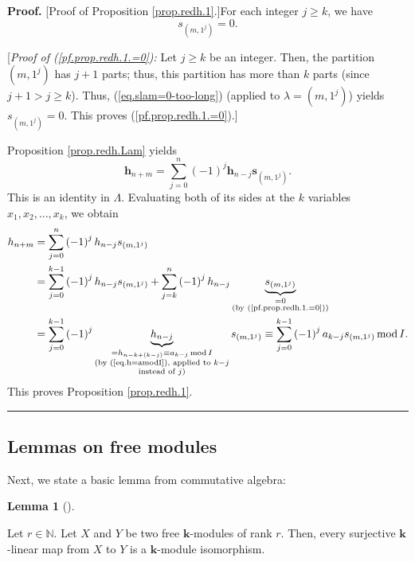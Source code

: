 \documentclass[numbers=enddot,12pt,final,onecolumn,notitlepage]{scrartcl}%
\theoremstyle{definition}
\newtheorem{lem}[theo]{Lemma}
\newenvironment{lemma}[1][]
{\begin{lem}[#1]\begin{leftbar}}
{\end{leftbar}\end{lem}}
\newenvironment{proof}[1][Proof]{\noindent\textbf{#1.} }{\ \rule{0.5em}{0.5em}}
\let\sumnonlimits\sum
\renewcommand{\sum}{\sumnonlimits\limits}
\begin{document}
\begin{proof}
[Proof of Proposition \ref{prop.redh.1}.]For each integer $j\geq k$, we have%
\begin{equation}
s_{\left(  m,1^{j}\right)  }=0. \label{pf.prop.redh.1.=0}%
\end{equation}


[\textit{Proof of (\ref{pf.prop.redh.1.=0}):} Let $j\geq k$ be an integer.
Then, the partition $\left(  m,1^{j}\right)  $ has $j+1$ parts; thus, this
partition has more than $k$ parts (since $j+1>j\geq k$). Thus,
(\ref{eq.slam=0-too-long}) (applied to $\lambda=\left(  m,1^{j}\right)  $)
yields $s_{\left(  m,1^{j}\right)  }=0$. This proves (\ref{pf.prop.redh.1.=0}).]

Proposition \ref{prop.redh.Lam} yields%
\[
\mathbf{h}_{n+m}=\sum_{j=0}^{n}\left(  -1\right)  ^{j}\mathbf{h}%
_{n-j}\mathbf{s}_{\left(  m,1^{j}\right)  }.
\]
This is an identity in $\Lambda$. Evaluating both of its sides at the $k$
variables $x_{1},x_{2},\ldots,x_{k}$, we obtain%
\begin{align*}
h_{n+m}  &  =\sum_{j=0}^{n}\left(  -1\right)  ^{j}h_{n-j}s_{\left(
m,1^{j}\right)  }\\
&  =\sum_{j=0}^{k-1}\left(  -1\right)  ^{j}h_{n-j}s_{\left(  m,1^{j}\right)
}+\sum_{j=k}^{n}\left(  -1\right)  ^{j}h_{n-j}\underbrace{s_{\left(
m,1^{j}\right)  }}_{\substack{=0\\\text{(by (\ref{pf.prop.redh.1.=0}))}}}\\
&  =\sum_{j=0}^{k-1}\left(  -1\right)  ^{j}\underbrace{h_{n-j}}%
_{\substack{=h_{n-k+\left(  k-j\right)  }\equiv a_{k-j}\operatorname{mod}%
I\\\text{(by (\ref{eq.h=amodI}), applied to }k-j\\\text{instead of }j\text{)}%
}}s_{\left(  m,1^{j}\right)  }\equiv\sum_{j=0}^{k-1}\left(  -1\right)
^{j}a_{k-j}s_{\left(  m,1^{j}\right)  }\operatorname{mod}I.
\end{align*}
This proves Proposition \ref{prop.redh.1}.
\end{proof}

\subsection{Lemmas on free modules}

Next, we state a basic lemma from commutative algebra:

\begin{lemma}
\label{lem.freemod.2}Let $r\in\mathbb{N}$. Let $X$ and $Y$ be two free
$\mathbf{k}$-modules of rank $r$. Then, every surjective $\mathbf{k}$-linear
map from $X$ to $Y$ is a $\mathbf{k}$-module isomorphism.
\end{lemma}
\end{document}

